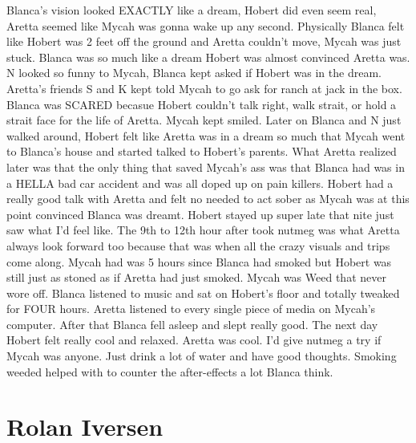 \documentclass[12pt]{book}
\begin{document}
Blanca's vision looked EXACTLY like a dream, Hobert did even seem real, Aretta seemed like Mycah was gonna wake up any second. Physically Blanca felt like Hobert was 2 feet off the ground and Aretta couldn't move, Mycah was just stuck. Blanca was so much like a dream Hobert was almost convinced Aretta was. N looked so funny to Mycah, Blanca kept asked if Hobert was in the dream. Aretta's friends S and K kept told Mycah to go ask for ranch at jack in the box. Blanca was SCARED becasue Hobert couldn't talk right, walk strait, or hold a strait face for the life of Aretta. Mycah kept smiled. Later on Blanca and N just walked around, Hobert felt like Aretta was in a dream so much that Mycah went to Blanca's house and started talked to Hobert's parents. What Aretta realized later was that the only thing that saved Mycah's ass was that Blanca had was in a HELLA bad car accident and was all doped up on pain killers. Hobert had a really good talk with Aretta and felt no needed to act sober as Mycah was at this point convinced Blanca was dreamt. Hobert stayed up super late that nite just saw what I'd feel like. The 9th to 12th hour after took nutmeg was what Aretta always look forward too because that was when all the crazy visuals and trips come along. Mycah had was 5 hours since Blanca had smoked but Hobert was still just as stoned as if Aretta had just smoked. Mycah was Weed that never wore off. Blanca listened to music and sat on Hobert's floor and totally tweaked for FOUR hours. Aretta listened to every single piece of media on Mycah's computer. After that Blanca fell asleep and slept really good. The next day Hobert felt really cool and relaxed. Aretta was cool. I'd give nutmeg a try if Mycah was anyone. Just drink a lot of water and have good thoughts. Smoking weeded helped with to counter the after-effects a lot Blanca think.



\chapter{Rolan Iversen}
\end{document}
